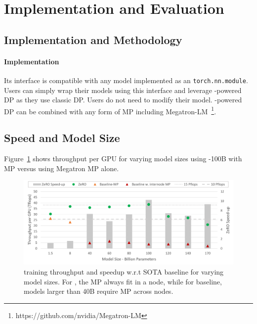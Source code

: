 \section{Implementation and Evaluation}\label{sec:evaluation}
  
\subsection{Implementation and Methodology}

\paragraph{Implementation}
Its interface is compatible with any model implemented as an {\tt torch.nn.module}. Users can simply wrap their models using this interface and leverage \name-powered DP as they use classic DP. Users do not need to modify their model.  \name-powered DP can be combined with any form of MP including Megatron-LM~\footnote{https://github.com/nvidia/Megatron-LM}.

\subsection{Speed and Model Size}
Figure~\ref{fig:billion_parameter_speedup} shows throughput per GPU for varying model sizes using \name-100B with MP versus using Megatron MP alone.

\begin{figure}[t!]
   \begin{center}
   \includegraphics[width=1.0\columnwidth]{model_size_and_speedup.PNG}
   \caption{\name training throughput and speedup w.r.t SOTA baseline for varying model sizes.  For \name, the MP always fit in a node, while for baseline, models larger than 40B require MP across nodes.} 
   \label{fig:billion_parameter_speedup}
   \end{center}
\end{figure}

